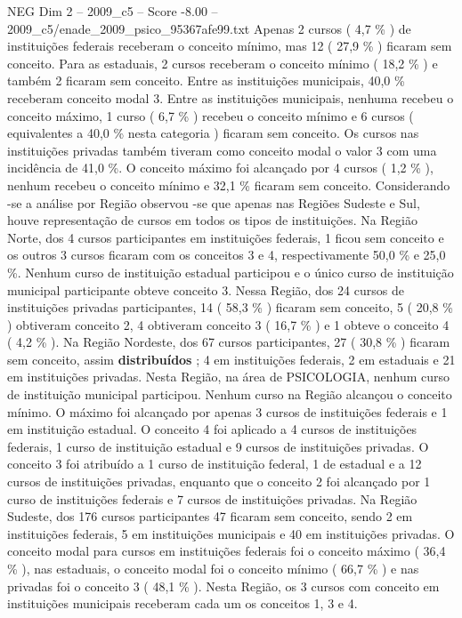 \begin{textsample}{NEG Dim 2 – 2009\_c5 – Score -8.00 – 2009\_c5/enade\_2009\_psico\_95367afe99.txt}
Apenas 2 cursos ( 4,7 \% ) de instituições federais receberam o conceito mínimo, mas 12 ( 27,9 \% ) ficaram sem conceito.
Para as estaduais, 2 cursos receberam o conceito mínimo ( 18,2 \% ) e também 2 ficaram sem conceito.
Entre as instituições municipais, 40,0 \% receberam conceito modal 3.
Entre as instituições municipais, nenhuma recebeu o conceito máximo, 1 curso ( 6,7 \% ) recebeu o conceito mínimo e 6 cursos ( equivalentes a 40,0 \% nesta categoria ) ficaram sem conceito.
Os cursos nas instituições privadas também tiveram como conceito modal o valor 3 com uma incidência de 41,0 \%.
O conceito máximo foi alcançado por 4 cursos ( 1,2 \% ), nenhum recebeu o conceito mínimo e 32,1 \% ficaram sem conceito.
Considerando -se a análise por Região observou -se que apenas nas Regiões Sudeste e Sul, houve representação de cursos em todos os tipos de instituições.
Na Região Norte, dos 4 cursos participantes em instituições federais, 1 ficou sem conceito e os outros 3 cursos ficaram com os conceitos 3 e 4, respectivamente 50,0 \% e 25,0 \%.
Nenhum curso de instituição estadual participou e o único curso de instituição municipal participante obteve conceito 3.
Nessa Região, dos 24 cursos de instituições privadas participantes, 14 ( 58,3 \% ) ficaram sem conceito, 5 ( 20,8 \% ) obtiveram conceito 2, 4 obtiveram conceito 3 ( 16,7 \% ) e 1 obteve o conceito 4 ( 4,2 \% ).
Na Região Nordeste, dos 67 cursos participantes, 27 ( 30,8 \% ) ficaram sem conceito, assim \textbf{distribuídos} ; 4 em instituições federais, 2 em estaduais e 21 em instituições privadas.
Nesta Região, na área de PSICOLOGIA, nenhum curso de instituição municipal participou.
Nenhum curso na Região alcançou o conceito mínimo.
O máximo foi alcançado por apenas 3 cursos de instituições federais e 1 em instituição estadual.
O conceito 4 foi aplicado a 4 cursos de instituições federais, 1 curso de instituição estadual e 9 cursos de instituições privadas.
O conceito 3 foi atribuído a 1 curso de instituição federal, 1 de estadual e a 12 cursos de instituições privadas, enquanto que o conceito 2 foi alcançado por 1 curso de instituições federais e 7 cursos de instituições privadas.
Na Região Sudeste, dos 176 cursos participantes 47 ficaram sem conceito, sendo 2 em instituições federais, 5 em instituições municipais e 40 em instituições privadas.
O conceito modal para cursos em instituições federais foi o conceito máximo ( 36,4 \% ), nas estaduais, o conceito modal foi o conceito mínimo ( 66,7 \% ) e nas privadas foi o conceito 3 ( 48,1 \% ).
Nesta Região, os 3 cursos com conceito em instituições municipais receberam cada um os conceitos 1, 3 e 4.

\end{textsample}
